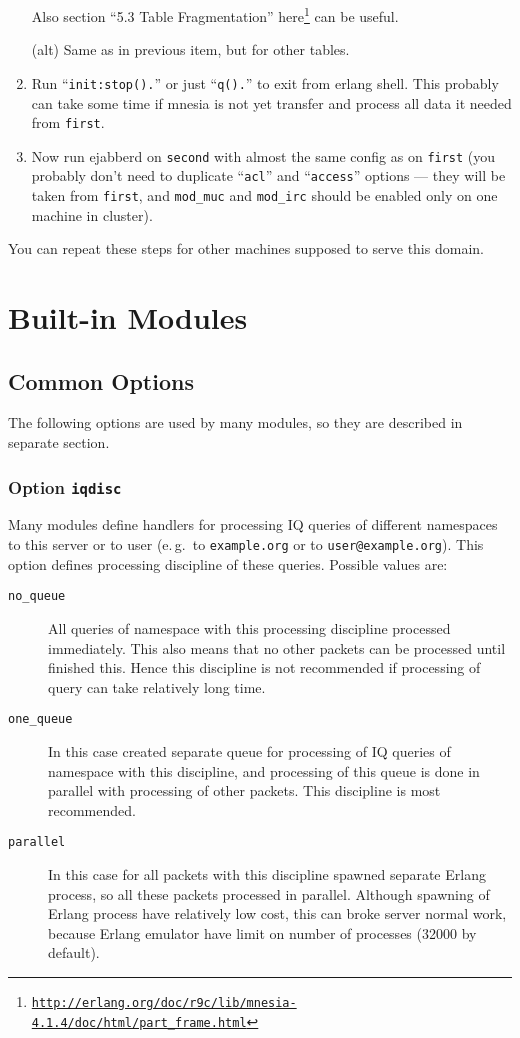 \documentclass[a4paper,10pt]{article}
\newcommand{\bracehack}{\def\{{\char"7B}\def\}{\char"7D}}
\newcommand{\jid}[1]{\texttt{#1}}
\newcommand{\option}[1]{\texttt{#1}}
\newcommand{\term}[1]{\texttt{#1}}
\newcommand{\titem}[1]{\item[\bracehack\texttt{#1}]}
\gdef\footahref#1#2{#2\footnote{\href{#1}{\texttt{#1}}}}
\begin{document}
\begin{enumerate}
  Also section ``5.3 Table Fragmentation''
  \footahref{http://erlang.org/doc/r9c/lib/mnesia-4.1.4/doc/html/part_frame.html}{here}
  can be useful.
  
  (alt) Same as in previous item, but for other tables.

  
\item Run ``\verb|init:stop().|'' or just ``\verb|q().|'' to exit from
  erlang shell.  This probably can take some time if mnesia is not yet
  transfer and process all data it needed from \term{first}.

  
\item Now run ejabberd on \term{second} with almost the same config as
  on \term{first} (you probably don't need to duplicate ``\verb|acl|''
  and ``\verb|access|'' options --- they will be taken from
  \term{first}, and \verb|mod_muc| and \verb|mod_irc| should be
  enabled only on one machine in cluster).
\end{enumerate}

You can repeat these steps for other machines supposed to serve this
domain.


\appendix{}

\section{Built-in Modules}
\label{sec:modules}

\subsection{Common Options}
\label{sec:modcommonopts}

The following options are used by many modules, so they are described in
separate section.

\subsubsection{Option \option{iqdisc}}
\label{sec:modiqdiscoption}

Many modules define handlers for processing IQ queries of different namespaces
to this server or to user (e.\,g.\ to \jid{example.org} or to
\jid{user@example.org}).  This option defines processing discipline of
these queries.  Possible values are:
\begin{description}
\titem{no\_queue} All queries of namespace with this processing
  discipline processed immediately.  This also means that no other packets can
  be processed until finished this.  Hence this discipline is not recommended
  if processing of query can take relatively long time.
\titem{one\_queue} In this case created separate queue for processing
  of IQ queries of namespace with this discipline, and processing of this queue
  is done in parallel with processing of other packets. This discipline is most
  recommended.
\titem{parallel} In this case for all packets with this discipline
  spawned separate Erlang process, so all these packets processed in parallel.
  Although spawning of Erlang process have relatively low cost, this can broke
  server normal work, because Erlang emulator have limit on number of processes
  (32000 by default).
\end{description}
\end{document}
